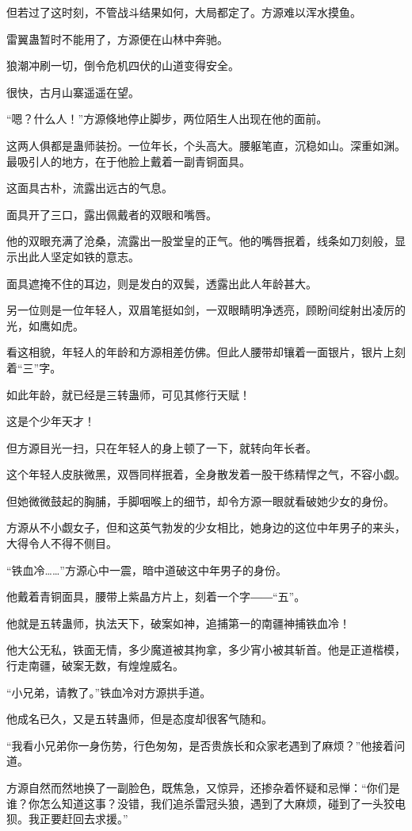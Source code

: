 \begin{this_body}
但若过了这时刻，不管战斗结果如何，大局都定了。方源难以浑水摸鱼。

雷翼蛊暂时不能用了，方源便在山林中奔驰。

狼潮冲刷一切，倒令危机四伏的山道变得安全。

很快，古月山寨遥遥在望。

“嗯？什么人！”方源倏地停止脚步，两位陌生人出现在他的面前。

这两人俱都是蛊师装扮。一位年长，个头高大。腰躯笔直，沉稳如山。深重如渊。最吸引人的地方，在于他脸上戴着一副青铜面具。

这面具古朴，流露出远古的气息。

面具开了三口，露出佩戴者的双眼和嘴唇。

他的双眼充满了沧桑，流露出一股堂皇的正气。他的嘴唇抿着，线条如刀刻般，显示出此人坚定如铁的意志。

面具遮掩不住的耳边，则是发白的双鬓，透露出此人年龄甚大。

另一位则是一位年轻人，双眉笔挺如剑，一双眼睛明净透亮，顾盼间绽射出凌厉的光，如鹰如虎。

看这相貌，年轻人的年龄和方源相差仿佛。但此人腰带却镶着一面银片，银片上刻着“三”字。

如此年龄，就已经是三转蛊师，可见其修行天赋！

这是个少年天才！

但方源目光一扫，只在年轻人的身上顿了一下，就转向年长者。

这个年轻人皮肤微黑，双唇同样抿着，全身散发着一股干练精悍之气，不容小觑。

但她微微鼓起的胸脯，手脚咽喉上的细节，却令方源一眼就看破她少女的身份。

方源从不小觑女子，但和这英气勃发的少女相比，她身边的这位中年男子的来头，大得令人不得不侧目。

“铁血冷……”方源心中一震，暗中道破这中年男子的身份。

他戴着青铜面具，腰带上紫晶方片上，刻着一个字――“五”。

他就是五转蛊师，执法天下，破案如神，追捕第一的南疆神捕铁血冷！

他大公无私，铁面无情，多少魔道被其拘拿，多少宵小被其斩首。他是正道楷模，行走南疆，破案无数，有煌煌威名。

“小兄弟，请教了。”铁血冷对方源拱手道。

他成名已久，又是五转蛊师，但是态度却很客气随和。

“我看小兄弟你一身伤势，行色匆匆，是否贵族长和众家老遇到了麻烦？”他接着问道。

方源自然而然地换了一副脸色，既焦急，又惊异，还掺杂着怀疑和忌惮：“你们是谁？你怎么知道这事？没错，我们追杀雷冠头狼，遇到了大麻烦，碰到了一头狡电狈。我正要赶回去求援。”


\end{this_body}
